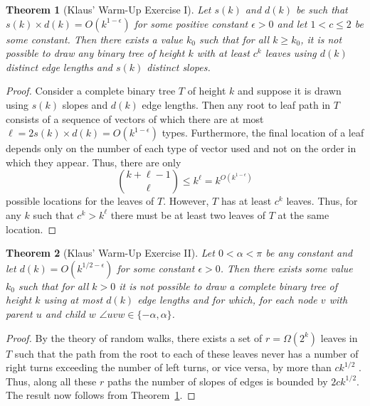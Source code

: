 \documentclass{article}
\newtheorem{thm}{Theorem}
\begin{document}
\begin{thm}[Klaus' Warm-Up Exercise I]\label{thm:klaus1}
Let $s(k)$ and $d(k)$ be such that $s(k)\times d(k)=O(k^{1-\epsilon})$
for some positive constant $\epsilon > 0$ and let $1<c\le 2$ be some
constant.  Then there exists a value
$k_0$ such that for all $k\ge k_0$, it is not possible to draw any
binary tree of height $k$ with at least $c^k$ leaves
using $d(k)$ distinct edge lengths and
$s(k)$ distinct slopes.
\end{thm}

\begin{proof}
Consider a complete binary tree $T$ of height $k$ and suppose it is
drawn using $s(k)$ slopes and $d(k)$ edge lengths.  Then any root to
leaf path in $T$ consists of a sequence of vectors of which there are
at most $\ell=2s(k)\times d(k)=O(k^{1-\epsilon})$ types.  Furthermore,
the final location of a leaf depends only on the number of each type
of vector used and not on the order in which they appear.  Thus, there
are only 
\[
           {k+\ell-1 \choose \ell} \le k^\ell = k^{O(k^{1-\epsilon})}
\]
possible locations for the leaves of $T$.  However, $T$
has at least $c^k$ leaves.  Thus, for any $k$ such that $c^k> k^\ell$ there
must be at least two leaves of $T$ at the same location.
\end{proof}

\begin{thm}[Klaus' Warm-Up Exercise II]\label{thm:klaus2}
Let $0<\alpha<\pi$ be any constant and let $d(k)=O(k^{1/2-\epsilon})$
for some constant $\epsilon > 0$.  Then there exists some 
value $k_0$ such that for all $k> 0$ it is not possible to draw a
complete binary tree of height $k$ using at most $d(k)$ edge lengths
and for which, for each node $v$ with parent $u$ and child $w$ $\angle
uvw\in\{-\alpha,\alpha\}$.
\end{thm}

\newcommand{\rwlen}{ck^{1/2}}

\begin{proof}
By the theory of random walks, there exists a set of $r=\Omega(2^{k})$
leaves in $T$ such that the path from the root to each of these leaves
never has a number of right turns exceeding the number of left turns,
or vice versa, by more than $\rwlen$ \cite{X}.  Thus, along all these
$r$ paths the number of slopes of edges is bounded by $2\rwlen$.  The
result now follows from Theorem~\ref{thm:klaus1}.
\end{proof}
\end{document}

